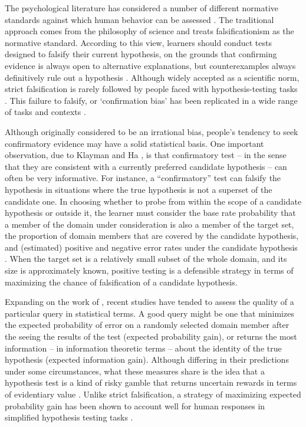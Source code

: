 \documentclass[10pt,letterpaper]{article}
\begin{document}
The psychological literature has considered a number of different normative standards against which human behavior can be assessed \cite{nelson2005usefulquestions}. The traditional approach comes from the philosophy of science and treats falsificationism as the normative standard. According to this view, learners should conduct tests designed to falsify their current hypothesis, on the grounds that confirming evidence is always open to alternative explanations, but counterexamples always definitively rule out a hypothesis \cite{popper1959scidiscovery}. Although widely accepted as a scientific norm, strict falsification is rarely followed by people faced with hypothesis-testing tasks \cite{wason1960failure,wason1968secondlook}. This failure to falsify, or `confirmation bias' has been replicated in a wide range of tasks and contexts \cite{nickerson1998confirmation}. 

Although originally considered to be an irrational bias, people's tendency to seek confirmatory evidence may have a solid statistical basis. One important observation, due to Klayman and Ha \cite{klayman1987confirmation}, is that confirmatory test -- in the sense that they are consistent with a currently preferred candidate hypothesis -- can often be very informative. For instance, a ``confirmatory'' test can falsify the hypothesis in situations where the true hypothesis is not a superset of the candidate one. In choosing whether to probe from within the scope of a candidate hypothesis or outside it, the learner must consider the base rate probability that a member of the domain under consideration is also a member of the target set, the proportion of domain members that are covered by the candidate hypothesis, and (estimated) positive and negative error rates under the candidate hypothesis \cite{klayman1987confirmation}. When the target set is a relatively small subset of the whole domain, and its size is approximately known, positive testing is a defensible strategy in terms of maximizing the chance of falsification of a candidate hypothesis.

Expanding on the work of , recent studies have tended to assess the quality of a particular query in statistical terms. A good query might be one that minimizes the expected probability of error on a randomly selected domain member after the seeing the results of the test (expected probability gain), or returns the most information -- in information theoretic terms -- about the identity of the true hypothesis (expected information gain). Although differing in their predictions under some circumstances, what these measures share is the idea that a hypothesis test is a kind of risky gamble that returns uncertain rewards in terms of evidentiary value \cite{poletiek2000gambles}. Unlike strict falsification, a strategy of maximizing expected probability gain has been shown to account well for human responses in simplified hypothesis testing tasks \cite{nelson2010probgain}. 
\end{document}
